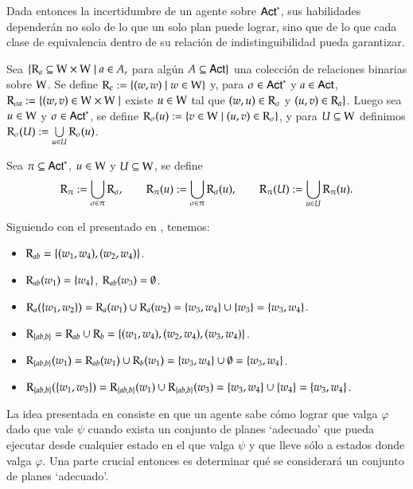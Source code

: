 Dada entonces la incertidumbre de un agente sobre ${\rm \sf Act}^*$, sus habilidades dependerán no solo de lo que un solo plan puede lograr, sino que de 
lo que cada clase de equivalencia dentro de su relación de indistinguibilidad pueda garantizar.

\begin{definicion}
    Sea $\{\mathrm{R}_a \subseteq \mathrm{W} \times \mathrm{W} \mid a \in A,$ para algún $A \subseteq {\rm \sf Act} \}$ una colección de relaciones binarias sobre $\mathrm{W}$. 
    Se define $\mathrm{R}_\epsilon := \{(w,w) \mid w \in \mathrm{W}\}$ y, para $\sigma \in {\rm \sf Act}^*$ y $a \in {\rm \sf Act}$, 
    $\mathrm{R}_{\sigma a} := \{(w,v) \in \mathrm{W} \times \mathrm{W} \mid$ existe $u \in \mathrm{W}$ tal que $(w,u) \in \mathrm{R}_\sigma$ y $(u,v) \in \mathrm{R}_a \}$. 
    Luego sea $u \in \mathrm{W}$ y $\sigma \in {\rm \sf Act}^*$, se define $\mathrm{R}_\sigma(u) := \{v\in\mathrm{W} \mid (u,v) \in \mathrm{R}_\sigma\}$, y para $U\subseteq\mathrm{W}$ 
    definimos $\mathrm{R}_\sigma(U) := \bigcup\limits_{u \in U} \mathrm{R}_\sigma(u)$.

    Sea $\pi \subseteq {\rm \sf Act}^*$, $u \in \mathrm{W}$ y $U \subseteq \mathrm{W}$, se define
    \[
        \mathrm{R}_\uppi := \bigcup_{\sigma \in \uppi} \mathrm{R}_{\sigma},
    \qquad
        \mathrm{R}_{\uppi}(u) := \bigcup_{\sigma \in \uppi} \mathrm{R}_\sigma(u),
    \qquad
        \mathrm{R}_{\uppi}(U) := \bigcup_{u \in U} \mathrm{R}_{\uppi}(u).
    \]
\end{definicion}

\begin{ejemplo}
    Siguiendo con el \ults presentado en , tenemos:
    \begin{itemize}
        \item $\mathrm{R}_{ab} = \{(w_1,w_4), (w_2, w_4)\}$.
        \item $\mathrm{R}_{ab}(w_1) = \{w_4\}$, \quad $\mathrm{R}_{ab}(w_3) = \emptyset$. 
        \item $\mathrm{R}_{a}(\{w_1,w_2\}) = \mathrm{R}_a(w_1) \cup \mathrm{R}_a(w_2) = \{w_3,w_4\} \cup \{w_3\} = \{w_3, w_4\}$.
        \item $\mathrm{R}_{\{ab,b\}} = \mathrm{R}_{ab} \cup \mathrm{R}_b = \{(w_1,w_4),(w_2,w_4),(w_3,w_4)\}$.
        \item $\mathrm{R}_{\{ab,b\}}(w_1) = \mathrm{R}_{ab}(w_1) \cup \mathrm{R}_b(w_1) = \{w_3,w_4\} \cup \emptyset = \{w_3,w_4\}$.
        \item $\mathrm{R}_{\{ab,b\}}(\{w_1,w_3\}) = \mathrm{R}_{\{ab,b\}}(w_1) \cup \mathrm{R}_{\{ab,b\}}(w_3) = \{w_3,w_4\} \cup \{w_4\} = \{w_3,w_4\}$.
    \end{itemize}
\end{ejemplo}


La idea presentada en \cite{ArecesFSV25,SaraviaPHD} consiste en que un agente sabe cómo lograr que valga $\varphi$ dado que vale $\psi$ cuando exista un 
conjunto de planes `adecuado' que pueda ejecutar desde cualquier estado en el que valga $\psi$ y que lleve sólo a estados donde valga $\varphi$. 
Una parte crucial entonces es determinar qué se considerará un conjunto de planes `adecuado'.

